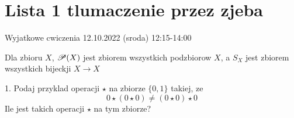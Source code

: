 \documentclass{article}[13pt]
\begin{document}
    \section{Lista 1 tlumaczenie przez zjeba}

    Wyjatkowe cwiczenia 12.10.2022 (sroda) 12:15-14:00\bigskip

    Dla zbioru $X$, $\mathcal{P}(X)$ jest zbiorem wszystkich podzbiorow $X$, a $S_X$ jest zbiorem wszystkich bijeckji $X\to X$\medskip

    1. Podaj przyklad operacji $\star$ na zbiorze $\{0,1\}$ takiej, ze
    $$0\star(0\star0)\neq(0\star0)\star0$$
    Ile jest takich operacji $\star$ na tym zbiorze?
\end{document}
